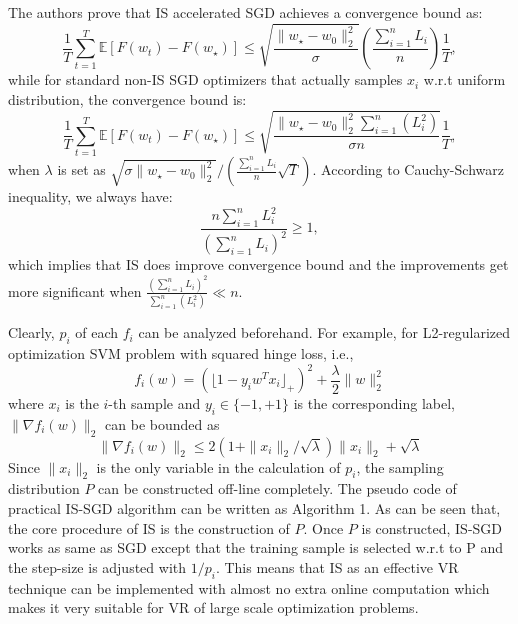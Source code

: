 \documentclass[twoside,leqno,twocolumn]{article}
\begin{document}
The authors prove that IS accelerated SGD achieves a convergence bound as:
\begin{equation}
\frac{1}{T}\sum_{t=1}^{T}\mathbb{E}[F(w_t)-F(w_{\star})]\le \sqrt{\frac{\|w_{\star}-w_0\|_2^2}{\sigma}}\left(\frac{\sum_{i=1}^{n}L_i}{n}\right)\frac{1}{T},
\end{equation}
while for standard non-IS SGD optimizers that actually samples $x_i$ w.r.t uniform distribution, the convergence bound is:
\begin{equation}
\frac{1}{T}\sum_{t=1}^{T}\mathbb{E}[F(w_t)-F(w_{\star})]\le \sqrt{\frac{\|w_{\star}-w_0\|_2^2\sum_{i=1}^{n}(L_i^2)}{\sigma n}} \frac{1}{T},
\end{equation}
when $\lambda$ is set as $\sqrt{\sigma\|w_{\star}-w_0\|_2^2}/\left(\frac{\sum_{i=1}^{n}L_i}{n}\sqrt{T}\right)$. According to Cauchy-Schwarz inequality, we always have:
\begin{equation}
\frac{n\sum_{i=1}^{n}L_i^2}{(\sum_{i=1}^{n}L_i)^2} \ge 1,
\end{equation}
which implies that IS does improve convergence bound and the improvements get more significant when $\frac{(\sum_{i=1}^{n}L_i)^2}{\sum_{i=1}^{n}(L_i^2)}\ll n$. 

Clearly, $p_i$ of each $f_i$ can be analyzed beforehand. For example, for L2-regularized optimization SVM problem with squared hinge loss, i.e., 
\begin{equation}
f_i(w)=(\lfloor 1-y_iw^{T}x_i \rfloor_{+})^2+\frac{\lambda}{2}\|w\|_2^2
\end{equation}
where $x_i$ is the $i$-th sample and $y_i \in \{-1,+1\} $ is the corresponding label, $\|\nabla f_{i}(w)\|_{2}$ can be bounded as 
\begin{equation}
\|\nabla f_{i}(w)\|_{2} \le 2(1+\|x_{i}\|_{2}/\sqrt{\lambda})\|x_{i}\|_{2}+\sqrt{\lambda}
\end{equation}
Since $\|x_i\|_2$ is the only variable in the calculation of $p_i$, the sampling distribution $P$ can be constructed off-line completely. The pseudo code of practical IS-SGD algorithm can be written as Algorithm 1. As can be seen that, the core procedure of IS is the construction of $P$. Once $P$ is constructed, IS-SGD works as same as SGD except that the training sample is selected w.r.t to P and the step-size is adjusted with ${1}/{p_i}$. This means that IS as an effective VR technique can be implemented with almost no extra online computation which makes it very suitable for VR of large scale optimization problems.
\end{document}
